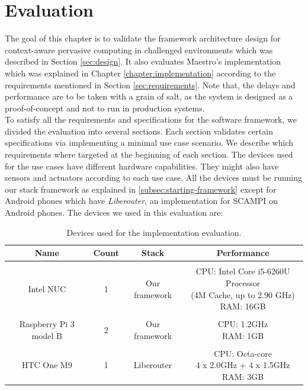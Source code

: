 
\chapter{Evaluation}\label{chapter:Evaluation}

The goal of this chapter is to validate the framework architecture design for context-aware pervasive computing in challenged environments which was described in Section \ref{sec:design}. It also evaluates Maestro's implementation which was explained in Chapter \ref{chapter:implementation} according to the requirements mentioned in Section \ref{sec:requirements}. Note that, the delays and performance are to be taken with a grain of salt, as the system is designed as a proof-of-concept and not to run in production systems. \\

\noindent To satisfy all the requirements and specifications for the software framework, we divided the evaluation into several sections. Each section validates certain specifications via implementing a minimal use case scenario. We describe which requirements where targeted at the beginning of each section. The devices used for  the use cases have different hardware capabilities. They might also have  sensors and actuators according to each use case. All the devices must be running our stack framework as explained in \ref{subsec:starting-framework} except for Android phones which have \textit{Liberouter}, an implementation for SCAMPI on Android phones. The devices we used in this evaluation are:
\begin{table}[!ht]
	\centering
	\begin{tabular}{*{4}{c}}\toprule
		Name & Count & Stack & Performance \\ \hline
		 &  &  &  \\
		Intel NUC &1& 	Our framework &   \specialcell[c]{CPU: Intel Core i5-6260U Processor\\ (4M Cache, up to 2.90 GHz)\\RAM: 16GB }\\ 
		&  &  &  \\
		Raspberry Pi 3 model B & 2 & Our framework &  \specialcell[c]{ CPU: 1.2GHz\\RAM: 1GB}  \\ 
		&  &  &  \\
		HTC One M9 & 1 & Liberouter &   \specialcell[c]{CPU: Octa-core \\4 x 2.0GHz + 4 x 1.5GHz\\ RAM: 3GB} \\ \hline

\end{tabular}
\caption{Devices used for the implementation evaluation.}
\label{table:devoces}
\end{table}

